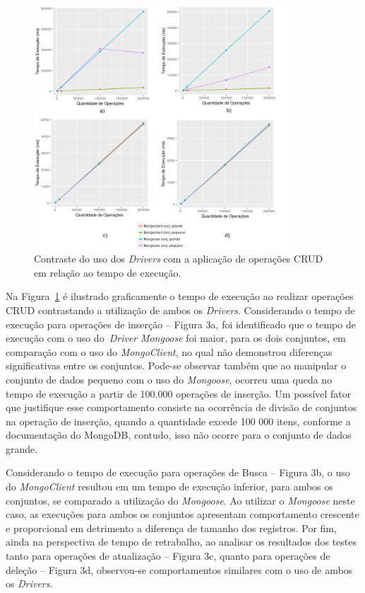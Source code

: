 \documentclass{svproc}
\begin{document}
\begin{figure}[!ht]
\centering
\includegraphics[width=0.85\textwidth]{images/time}
\caption{Contraste do uso dos \emph{Drivers} com a aplicação de operações CRUD em relação ao tempo de execução.}
\label{fig:time}
\end{figure}

Na Figura~\ref{fig:time} é ilustrado graficamente o tempo de execução ao realizar operações CRUD contrastando a utilização de ambos os \emph{Drivers}. Considerando o tempo de execução para operações de inserção -- Figura 3a, foi identificado que o tempo de execução com o uso do~\emph{Driver} \emph{Mongoose} foi maior, para os dois conjuntos, em comparação com o uso do \emph{MongoClient}, no qual não demonstrou diferenças significativas entre os conjuntos. Pode-se observar também que ao manipular o conjunto de dados pequeno com o uso do \emph{Mongoose}, ocorreu uma queda no tempo de execução a partir de 100.000 operações de inserção. Um possível fator que justifique esse comportamento consiste na ocorrência de divisão de conjuntos na operação de inserção, quando a quantidade excede 100 000 itens, conforme a documentação do MongoDB, contudo, isso não ocorre para o conjunto de dados grande.

Considerando o tempo de execução para operações de Busca -- Figura 3b, o uso do \emph{MongoClient} resultou em um tempo de execução inferior, para ambos os conjuntos, se comparado a utilização do \emph{Mongoose}. Ao utilizar o \emph{Mongoose} neste caso, as execuções para ambos os conjuntos apresentam comportamento crescente e proporcional em detrimento a diferença de tamanho dos registros. Por fim, ainda na perspectiva de tempo de retrabalho, ao analisar os resultados dos testes tanto para operações de atualização -- Figura 3c, quanto para operações de deleção -- Figura 3d, observou-se comportamentos similares com o uso de ambos os \emph{Drivers}.
\end{document}
